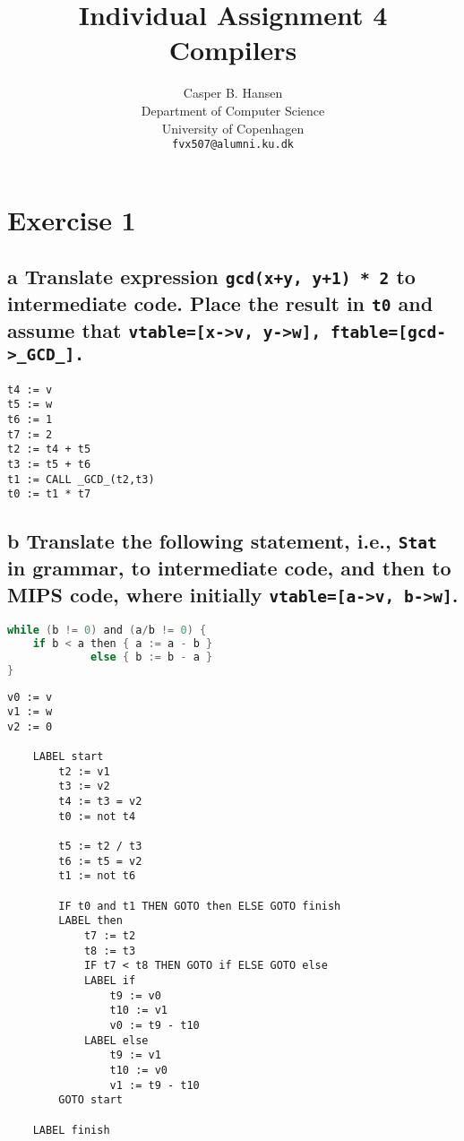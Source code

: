 \documentclass[11pt,a4paper]{article}
\title
{
	{\large Individual Assignment 4}\\
	Compilers
}
\author
{
	Casper B. Hansen\\
	Department of Computer Science\\
	University of Copenhagen\\
	{\tt fvx507@alumni.ku.dk}
}
\begin{document}
\clearpage
\maketitle

\section{Exercise 1}
%

\subsection*{a \mdseries Translate expression {\tt gcd(x+y, y+1) * 2} to
intermediate code. Place the result in {\tt t0} and assume that
{\tt vtable=[x->v, y->w], ftable=[gcd->\_GCD\_].}}
\begin{lstlisting}
t4 := v
t5 := w
t6 := 1
t7 := 2
t2 := t4 + t5
t3 := t5 + t6
t1 := CALL _GCD_(t2,t3)
t0 := t1 * t7
\end{lstlisting}

\newpage
\subsection*{b \mdseries Translate the following statement, i.e., {\tt Stat}
in grammar, to intermediate code, and then to MIPS code, where initially
{\tt vtable=[a->v, b->w]}.}
\begin{lstlisting}[language=C]
while (b != 0) and (a/b != 0) {
	if b < a then { a := a - b }
			 else { b := b - a }
}
\end{lstlisting}
\begin{lstlisting}
v0 := v
v1 := w
v2 := 0

	LABEL start
		t2 := v1
		t3 := v2
		t4 := t3 = v2
		t0 := not t4

		t5 := t2 / t3
		t6 := t5 = v2
		t1 := not t6
		
		IF t0 and t1 THEN GOTO then ELSE GOTO finish
		LABEL then
			t7 := t2
			t8 := t3
			IF t7 < t8 THEN GOTO if ELSE GOTO else
			LABEL if
				t9 := v0
				t10 := v1
				v0 := t9 - t10
			LABEL else
				t9 := v1
				t10 := v0
				v1 := t9 - t10
		GOTO start

	LABEL finish
\end{lstlisting}

\end{document}
